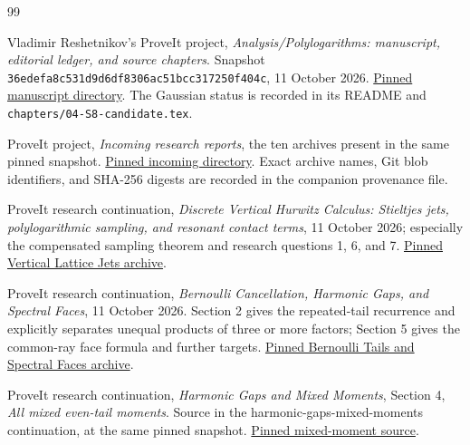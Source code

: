 \documentclass[11pt,letterpaper]{article}
\numberwithin{equation}{section}
\theoremstyle{definition}
\theoremstyle{remark}
\begin{document}
\clearpage
\begin{thebibliography}{99}

Vladimir Reshetnikov's ProveIt project,
\emph{Analysis/Polylogarithms: manuscript, editorial ledger, and source chapters}.
Snapshot \texttt{36edefa8c531d9d6df8306ac51bcc317250f404c},
11 October 2026.
\href{https://github.com/VladimirReshetnikov/ProveIt/tree/36edefa8c531d9d6df8306ac51bcc317250f404c/Analysis/Polylogarithms/docs/manuscript}{Pinned manuscript directory}.
The Gaussian status is recorded in its README and
\texttt{chapters/04-S8-candidate.tex}.

ProveIt project, \emph{Incoming research reports},
the ten archives present in the same pinned snapshot.
\href{https://github.com/VladimirReshetnikov/ProveIt/tree/36edefa8c531d9d6df8306ac51bcc317250f404c/docs/incoming}{Pinned incoming directory}.
Exact archive names, Git blob identifiers, and SHA-256 digests are
recorded in the companion provenance file.

ProveIt research continuation,
\emph{Discrete Vertical Hurwitz Calculus:
Stieltjes jets, polylogarithmic sampling, and resonant contact terms},
11 October 2026; especially the compensated sampling theorem and
research questions 1, 6, and 7.
\href{https://github.com/VladimirReshetnikov/ProveIt/blob/36edefa8c531d9d6df8306ac51bcc317250f404c/docs/incoming/ProveIt_Vertical_Lattice_Jets_2026-10-11.zip}{Pinned Vertical Lattice Jets archive}.

ProveIt research continuation,
\emph{Bernoulli Cancellation, Harmonic Gaps, and Spectral Faces},
11 October 2026. Section 2 gives the repeated-tail recurrence and
explicitly separates unequal products of three or more factors;
Section 5 gives the common-ray face formula and further targets.
\href{https://github.com/VladimirReshetnikov/ProveIt/blob/36edefa8c531d9d6df8306ac51bcc317250f404c/docs/incoming/ProveIt_Bernoulli_Tails_and_Spectral_Faces_2026-10-11.zip}{Pinned Bernoulli Tails and Spectral Faces archive}.

ProveIt research continuation,
\emph{Harmonic Gaps and Mixed Moments}, Section 4,
\emph{All mixed even-tail moments}.
Source in the harmonic-gaps-mixed-moments continuation,
at the same pinned snapshot.
\href{https://github.com/VladimirReshetnikov/ProveIt/blob/36edefa8c531d9d6df8306ac51bcc317250f404c/Analysis/Polylogarithms/docs/reports/stieltjes-harmonic-resonance/continuations/harmonic-gaps-mixed-moments/sections/04_mixed_moments.tex}{Pinned mixed-moment source}.


\end{thebibliography}
\end{document}
